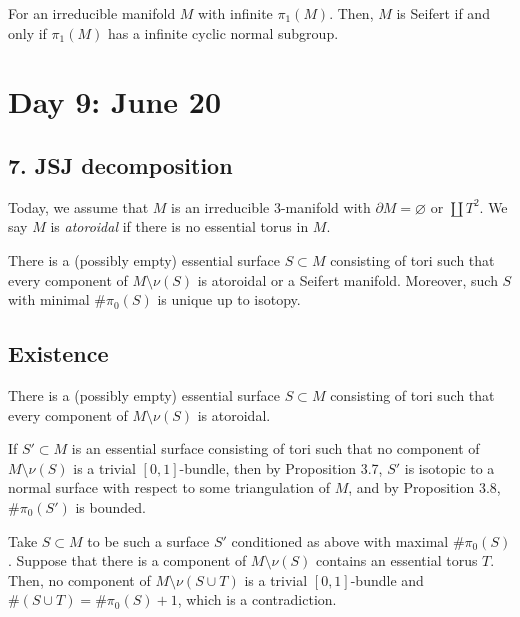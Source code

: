 \documentclass{../../../small}
\begin{document}
\begin{thm}
For an irreducible manifold $M$ with infinite $\pi_1(M)$.
Then, $M$ is Seifert if and only if $\pi_1(M)$ has a infinite cyclic normal subgroup.
\end{thm}



\newpage
\setcounter{section}{8}
\section{Day 9: June 20}
\setcounter{section}{7}
\subsection*{7. JSJ decomposition}
Today, we assume that $M$ is an irreducible 3-manifold with $\partial M=\varnothing$ or $\coprod T^2$.
We say $M$ is \emph{atoroidal} if there is no essential torus in $M$.

\begin{thm}
There is a (possibly empty) essential surface $S\subset M$ consisting of tori such that every component of $M\setminus\nu(S)$ is atoroidal or a Seifert manifold.
Moreover, such $S$ with minimal $\#\pi_0(S)$ is unique up to isotopy.
\end{thm}

\subsection{Existence}
\begin{prop}
There is a (possibly empty) essential surface $S\subset M$ consisting of tori such that every component of $M\setminus\nu(S)$ is atoroidal.
\end{prop}
\begin{pf}
If $S'\subset M$ is an essential surface consisting of tori such that no component of $M\setminus\nu(S)$ is a trivial $[0,1]$-bundle, then by Proposition 3.7, $S'$ is isotopic to a normal surface with respect to some triangulation of $M$, and by Proposition 3.8, $\#\pi_0(S')$ is bounded.

Take $S\subset M$ to be such a surface $S'$ conditioned as above with maximal $\#\pi_0(S)$.
Suppose that there is a component of $M\setminus\nu(S)$ contains an essential torus $T$.
Then, no component of $M\setminus\nu(S\cup T)$ is a trivial $[0,1]$-bundle and $\#(S\cup T)=\#\pi_0(S)+1$, which is a contradiction.
\end{pf}
\end{document}
